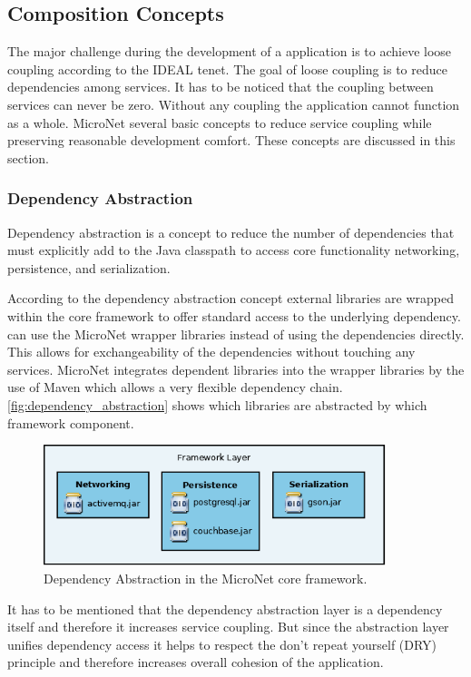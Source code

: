 \subsection{Composition Concepts}

The major challenge during the development of a \ms{} application is to achieve
loose coupling according to the IDEAL tenet. The goal of loose coupling is to
reduce dependencies among services. It has to be noticed that the coupling
between services can never be zero. Without any coupling the application cannot
function as a whole. MicroNet several basic concepts to reduce service coupling
while preserving reasonable development comfort. These concepts are discussed in
this section.

\subsubsection{Dependency Abstraction}

Dependency abstraction is a concept to reduce the number of dependencies
that \mss{} must explicitly add to the Java classpath to access core
functionality networking, persistence, and serialization.

According to the dependency abstraction concept external libraries are wrapped
within the core framework to offer standard access to the underlying dependency.
\mss{} can use the MicroNet wrapper libraries instead of using the
dependencies directly. This allows for exchangeability of the dependencies
without touching any \mss{} services. MicroNet integrates dependent libraries
into the wrapper libraries by the use of Maven which allows a very flexible
dependency chain. \autoref{fig:dependency_abstraction} shows which libraries are
abstracted by which framework component.

\begin{figure}
	\centering
	\includegraphics[width=10cm]{images/architecture/DependencyAbstraction}
	\caption{Dependency Abstraction in the MicroNet core framework.}
	\label{fig:dependency_abstraction}
\end{figure}

It has to be mentioned that the dependency abstraction layer is a dependency
itself and therefore it increases service coupling. But since the abstraction
layer unifies dependency access it helps to respect the don't repeat yourself (DRY)
principle and therefore increases overall cohesion of the application. 

